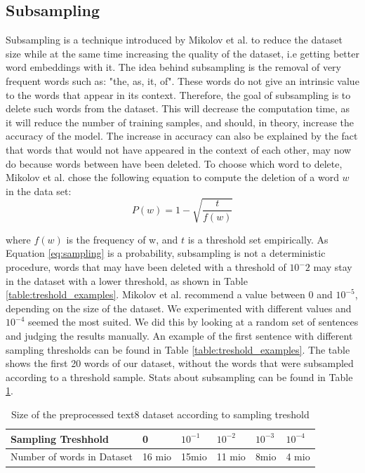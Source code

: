 \subsection{Subsampling}
Subsampling is a technique introduced by Mikolov et al. \cite{mikolov} to reduce the dataset size while at the same time increasing the quality of the dataset, i.e getting better word embeddings with it. The idea behind subsampling is the removal of very frequent words such as: "the, as, it, of". These words do not give an intrinsic value to the words that appear in its context. Therefore, the goal of subsampling is to delete such words from the dataset. This will decrease the computation time, as it will reduce the number of training samples, and should, in theory, increase the accuracy of the model. The increase in accuracy can also be explained by the fact that words that would not have appeared in the context of each other, may now do because words between have been deleted.
To choose which word to delete, Mikolov et al. \cite{mikolov2} chose the following equation to compute the deletion of a word $w$ in the data set:
\begin{equation} \label{eq:sampling}
P(w) = 1- \sqrt{{\frac{t}{f(w)}}}
\end{equation}

where $f(w)$ is the frequency of w, and $t$ is a threshold set empirically. As Equation \ref{eq:sampling} is a probability, subsampling is not a deterministic procedure, words that may have been deleted with a threshold of $10^-2$ may stay in the dataset with a lower threshold, as shown in Table \ref{table:treshold_examples}. Mikolov et al. recommend a value between $0$ and $10^{-5}$, depending on the size of the dataset. We experimented with different values and $10^{-4}$ seemed the most suited. We did this by looking at a random set of sentences and judging the results manually. An example of the first sentence with different sampling thresholds can be found in Table \ref{table:treshold_examples}. The table shows the first 20 words of our dataset, without the words that were subsampled according to a threshold sample. Stats about subsampling can be found in Table \ref{table:treshold}.
\begin{table}[h]
\centering
\begin{tabular}{|l|l|l|l|l|l|}
\hline
Sampling Treshhold & 0 & $ 10^{-1}$&$ 10^{-2}$& $10^{-3} $ &$10^{-4} $ \\ \hline
Number of words in Dataset & 16 mio & 15mio & 11 mio & 8mio & 4 mio \\ \hline
\end{tabular}
\caption{Size of the preprocessed text8 dataset according to sampling treshold}
\label{table:treshold}
\end{table}

